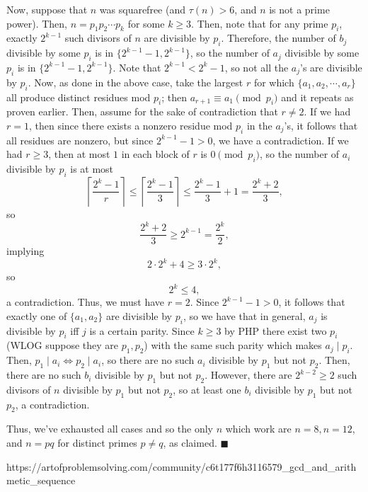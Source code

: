 \documentclass[a4paper]{article}
\begin{document}
\begin{question}[c]{}
{Now, suppose that $n$ was squarefree (and $\tau(n) > 6$, and $n$ is not a prime power). Then, $n = p_1p_2\cdots p_k$ for some $k\geq 3$. Then, note that for any prime $p_i$, exactly $2^{k-1}$ such divisors of $n$ are divisible by $p_i$. Therefore, the number of $b_j$ divisible by some $p_i$ is in $\{2^{k-1} - 1, 2^{k-1}\}$, so the number of $a_j$ divisible by some $p_i$ is in $\{2^{k-1}-1, 2^{k-1}\}$. Note that $2^{k-1} < 2^k-1$, so not all the $a_j$'s are divisible by $p_i$. Now, as done in the above case, take the largest $r$ for which $\{a_1, a_2, \cdots, a_r\}$ all produce distinct residues mod $p_i$; then $a_{r+1}\equiv a_1\pmod{p_i}$ and it repeats as proven earlier. Then, assume for the sake of contradiction that $r\neq 2$. If we had $r = 1$, then since there exists a nonzero residue mod $p_i$ in the $a_j$'s, it follows that all residues are nonzero, but since $2^{k-1} - 1 > 0$, we have a contradiction. If we had $r \geq 3$, then at most $1$ in each block of $r$ is $0\pmod{p_i}$, so the number of $a_i$ divisible by $p_i$ is at most $$\left \lceil \frac{2^k-1}{r}\right \rceil \leq \left \lceil \frac{2^k-1}{3}\right \rceil \leq \frac{2^k-1}{3} + 1 = \frac{2^k+2}{3},$$so $$\frac{2^k+2}{3} \geq 2^{k-1} = \frac{2^k}{2},$$implying $$2\cdot 2^k + 4\geq 3\cdot 2^k,$$so $$2^k \leq 4,$$a contradiction. Thus, we must have $r = 2$. Since $2^{k-1} - 1 > 0$, it follows that exactly one of $\{a_1, a_2\}$ are divisible by $p_i$, so we have that in general, $a_j$ is divisible by $p_i$ iff $j$ is a certain parity. Since $k\geq 3$ by PHP there exist two $p_i$ (WLOG suppose they are $p_1, p_2$) with the same such parity which makes $a_j \mid p_i$. Then, $p_1\mid a_i\iff p_2 \mid a_i$, so there are no such $a_i$ divisible by $p_1$ but not $p_2$. Then, there are no such $b_i$ divisible by $p_1$ but not $p_2$. However, there are $2^{k-2} \geq 2$ such divisors of $n$ divisible by $p_1$ but not $p_2$, so at least one $b_i$ divisible by $p_1$ but not $p_2$, a contradiction.

Thus, we've exhausted all cases and so the only $n$ which work are $n = 8, n=12$, and $n=pq$ for distinct primes $p\neq q$, as claimed. $\blacksquare$
    }{%
    https://artofproblemsolving.com/community/c6t177f6h3116579_gcd_and_arithmetic_sequence
  }


\end{question}
\end{document}
